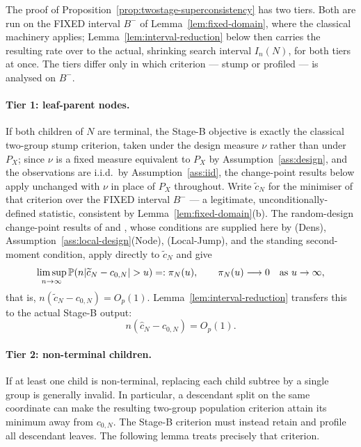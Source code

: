 \documentclass[11pt]{article}
\theoremstyle{plain}
\theoremstyle{definition}
\theoremstyle{remark}
\newcommand{\PP}{\mathbb{P}}
\DeclarePairedDelimiter{\abs}{\lvert}{\rvert}
\begin{document}
The proof of Proposition~\ref{prop:twostage-superconsistency} has two tiers.
Both are run on the FIXED interval $B^-$ of
Lemma~\ref{lem:fixed-domain}, where the classical machinery applies;
Lemma~\ref{lem:interval-reduction} below then carries the resulting rate over
to the actual, shrinking search interval $I_n(N)$, for both tiers at once. The
tiers differ only in which criterion --- stump or profiled --- is analysed on
$B^-$.

\paragraph{Tier 1: leaf-parent nodes.}
If both children of \(N\) are terminal, the Stage-B objective is exactly the
classical two-group stump criterion, taken under the design measure \(\nu\)
rather than under \(P_X\); since \(\nu\) is a fixed measure equivalent to
\(P_X\) by Assumption~\ref{ass:design}, and the observations are i.i.d.\ by
Assumption~\ref{ass:iid}, the change-point results below apply unchanged with
\(\nu\) in place of \(P_X\) throughout.
Write $\widetilde c_N$ for the minimiser of that criterion over the FIXED
interval $B^-$ --- a legitimate, unconditionally-defined statistic, consistent
by Lemma~\ref{lem:fixed-domain}(b). The random-design change-point
results of
\citet{chan1993} and \citet{seijosen2011}, whose
conditions are supplied here by (Dens), Assumption~\ref{ass:local-design}(Node),
(Local-Jump), and the standing
second-moment condition, apply directly to $\widetilde c_N$ and give
\[
  \limsup_{n\to\infty}
  \PP\!\left(n\abs{\widetilde c_N-c_{0,N}}>u\right)
  =:\pi_N(u),
  \qquad
  \pi_N(u)\longrightarrow0
  \quad\text{as }u\to\infty ,
\]
that is, $n(\widetilde c_N-c_{0,N})=O_p(1)$. Lemma~\ref{lem:interval-reduction}
transfers this to the actual Stage-B output:
\[
  n(\widehat c_N-c_{0,N})=O_p(1).
\]

\paragraph{Tier 2: non-terminal children.}
If at least one child is non-terminal, replacing each child subtree by a
single group is generally invalid.  In particular, a descendant split on the
same coordinate can make the resulting two-group population criterion attain
its minimum away from \(c_{0,N}\).  The Stage-B criterion must instead retain
and profile all descendant leaves.  The following lemma treats precisely that
criterion.
\end{document}
